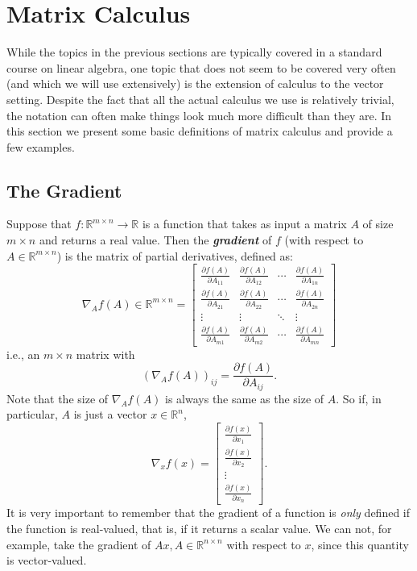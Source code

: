 \documentclass[12pt]{article}
\begin{document}
%


\section{Matrix Calculus}
While the topics in the previous sections are typically covered in a
standard course on linear algebra, one topic that does not seem to be
covered very often (and which we will use extensively) is the
extension of calculus to the vector setting.  Despite the fact that
all the actual calculus we use is relatively trivial, the notation can
often make things look much more difficult than they are.  In this
section we present some basic definitions of matrix calculus and
provide a few examples.

\subsection{The Gradient}
Suppose that $f:\mathbb{R}^{m \times n} \rightarrow \mathbb{R}$ is a
function that takes as input a matrix $A$ of size $m \times n$ and
returns a real value.  Then the \textbf{\textit{gradient}} of $f$
(with respect to $A \in \mathbb{R}^{m \times n}$) is the matrix of
partial derivatives, defined as:
\[\nabla_A f(A) \in \mathbb{R}^{m \times n} = \left [
  \begin{array}{cccc} \frac{\partial f(A)}{\partial A_{11}} & 
  \frac{\partial f(A)}{\partial A_{12}} & \cdots & \frac{\partial
  f(A)}{\partial A_{1n}}  \\ \frac{\partial f(A)}{\partial A_{21}} &
  \frac{\partial f(A)}{\partial A_{22}}  & \cdots & \frac{\partial
  f(A)}{\partial A_{2n}}  \\
  \vdots & \vdots & \ddots & \vdots \\ \frac{\partial f(A)}{\partial
  A_{m1}}  & \frac{\partial f(A)}{\partial A_{m2}}  & \cdots &
  \frac{\partial f(A)}{\partial A_{mn}} \end{array} \right ] \]
i.e., an $m \times n$ matrix with \[(\nabla_A f(A))_{ij} =
  \frac{\partial f(A)}{\partial A_{ij}}.\]
Note that the size of $\nabla_A f(A)$ is always the
  same as the size of $A$.  So if, in particular, $A$ is just a vector
  $x \in \mathbb{R}^n$,
\[\nabla_x f(x) = \left [ \begin{array}{c} \frac{\partial
  f(x)}{\partial x_1} \\ \frac{\partial f(x)}{\partial x_2} \\ \vdots
  \\ \frac{\partial f(x)}{\partial x_n}\end{array} \right ].\]
It is very important to remember that the gradient of a function is
\textit{only} defined if the function is real-valued, that is, if it
returns a scalar value.  We can not, for example, take the gradient of
$Ax, A \in \mathbb{R}^{n \times n}$ with respect to $x$, since this
quantity is vector-valued.
\end{document}
